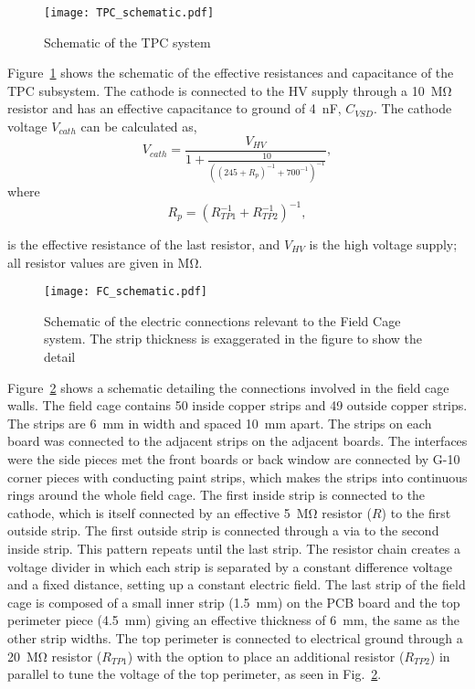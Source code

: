 \begin{figure}[!htb]
\centering
\texttt{[image: TPC\_schematic.pdf]}
\caption{Schematic of the TPC system}
\label{fig:TPC_schematic}
\end{figure}

Figure~\ref{fig:TPC_schematic} shows the schematic of the effective resistances and capacitance of the TPC subsystem. The cathode is connected to the HV supply through a \SI{10}{\mega\ohm} resistor and has an effective capacitance to ground of \SI{4}{\nano\farad}, $C_{VSD}$. The cathode voltage $V_{cath}$ can be calculated as,
\begin{equation}
V_{cath} = \frac{V_{HV}}{ 1 + \frac{10}{ \left( (245 + R_p)^{-1} + 700^{-1} \right)^{-1} } },
\end{equation}
where 
\begin{equation}
R_p = \left( R_{TP1}^{-1} + R_{TP2}^{-1} \right)^{-1},
 \label{eq:Reff}
\end{equation} 

is the effective resistance of the last resistor, and $V_{HV}$ is the high voltage supply; all resistor values are given in \si{\mega\ohm}.


\begin{figure}[!htb]
\centering
\texttt{[image: FC\_schematic.pdf]}
\caption{Schematic of the electric connections relevant to the Field Cage system. The strip thickness is exaggerated in the figure to show the detail}
\label{fig:FC_schematic}
\end{figure}

Figure~\ref{fig:FC_schematic} shows a schematic detailing the connections involved in the field cage walls. The field cage contains 50 inside copper strips and 49 outside copper strips. The strips are \SI{6}{\milli\metre} in width and spaced \SI{10}{\milli\metre} apart. The strips on each board was connected to the adjacent strips on the adjacent boards. The interfaces were the side pieces met the front boards or back window are connected by G-10 corner pieces with conducting paint strips, which makes the strips into continuous rings around the whole field cage. The first inside strip is connected to the cathode, which is itself connected by an effective \SI{5}{\mega\ohm} resistor ($R$) to the first outside strip. The first outside strip is connected through a via to the second inside strip. This pattern repeats until the last strip. The resistor chain creates a voltage divider in which each strip is separated by a constant difference voltage and a fixed distance, setting up a constant electric field. The last strip of the field cage is composed of a small inner strip  (\SI{1.5}{\milli\metre}) on the PCB board and the top perimeter piece (\SI{4.5}{\milli\metre}) giving an  effective thickness of \SI{6}{\milli\metre}, the same as the other strip widths. The top perimeter is connected to electrical ground through a \SI{20}{\mega\ohm} resistor ($R_{TP1}$) with the option to place an additional resistor ($R_{TP2}$) in parallel to tune the voltage of the top perimeter, as seen in Fig.~\ref{fig:FC_schematic}. 

